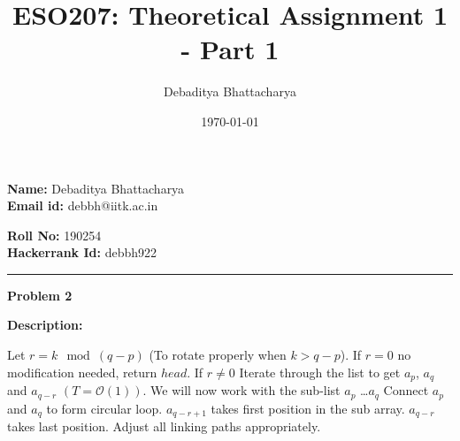 \documentclass[10pt, a4paper]{article}
\title{ESO207: Theoretical Assignment 1 - Part 1}
\author{Debaditya Bhattacharya}
\date{\today}
\newcommand{\BigO}{\mathcal{O}}
\begin{document}
\maketitle

\noindent\begin{minipage}{2in}
    \textbf{Name: }Debaditya Bhattacharya \\
    \textbf{Email id: }debbh@iitk.ac.in  
\end{minipage}
\hfill
\noindent\begin{minipage}{1.9in}
    \textbf{Roll No: }190254\\
    \textbf{Hackerrank Id: }debbh922
\end{minipage}

\noindent\rule{\textwidth}{1px}
\parskip 0.3cm

\noindent\large{\textbf{Problem 2}}
\vspace{5pt}

\normalsize

\noindent\textbf{Description:}

Let $r = k\mod(q-p)$ (To rotate properly when $k>q-p$). If $r=0$ no modification needed, return $head$. If $r\neq 0$ Iterate through the list to get $a_p$, $a_q$ and $a_{q-r}$ $(T =\BigO(1))$. We will now work with the sub-list $a_p$ \dots $a_q$ Connect $a_p$ and $a_q$ to form circular loop. $a_{q-r+1}$ takes first position in the sub array. $a_{q-r}$ takes last position. Adjust all linking paths appropriately.

\vspace{5pt}
\end{document}
